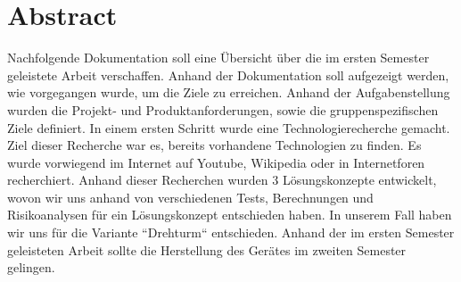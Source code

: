 \section{Abstract}
Nachfolgende Dokumentation soll eine Übersicht über die im ersten Semester geleistete Arbeit verschaffen. Anhand der Dokumentation soll aufgezeigt werden, wie vorgegangen wurde, um die Ziele zu erreichen. Anhand der Aufgabenstellung wurden die Projekt- und Produktanforderungen, sowie die gruppenspezifischen Ziele definiert. In einem ersten Schritt wurde eine Technologierecherche gemacht. Ziel dieser Recherche war es, bereits vorhandene Technologien zu finden. Es wurde vorwiegend im Internet auf Youtube, Wikipedia oder in Internetforen recherchiert. Anhand dieser Recherchen wurden 3 Lösungskonzepte entwickelt, wovon wir uns anhand von verschiedenen Tests, Berechnungen und Risikoanalysen für ein Lösungskonzept entschieden haben. In unserem Fall haben wir uns für die Variante “Drehturm“ entschieden. Anhand der im ersten Semester geleisteten Arbeit sollte die Herstellung des Gerätes im zweiten Semester gelingen.